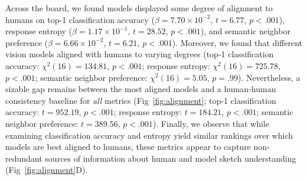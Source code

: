 \documentclass{article}
\begin{document}

Across the board, we found models displayed some degree of alignment to humans on top-1 classification accuracy ($\beta= 7.70\times10^{-2}$, $t=6.77$, $p<.001$), response entropy ($\beta=1.17\times10^{-1}$, $t=28.52$, $p<.001$), and semantic neighbor preference ($\beta = 6.66\times10^{-2}$, $t = 6.21$, $p<.001$). 
Moreover, we found that different vision models aligned with humans to varying degrees (top-1 classification accuracy: $\chi^2(16) = 134.81$, $p<.001$; response entropy: $\chi^2(16) = 725.78$, $p<.001$; semantic neighbor preference: $\chi^2(16) = 5.05$, $p=.99$).
Nevertheless, a sizable gap remains between the most aligned models and a human-human consistency baseline for \textit{all} metrics (Fig~\ref{fig:alignment}; top-1 classification accuracy: $t = 952.19$, $p<.001$; response entropy: $t = 184.21$, $p<.001$; semantic neighbor preference: $t=389.56$, $p<.001$).
Finally, we observe that while examining classification accuracy and entropy yield similar rankings over which models are best aligned to humans, these metrics appear to capture non-redundant sources of information about human and model sketch understanding (Fig~\ref{fig:alignment}D).


\end{document}
